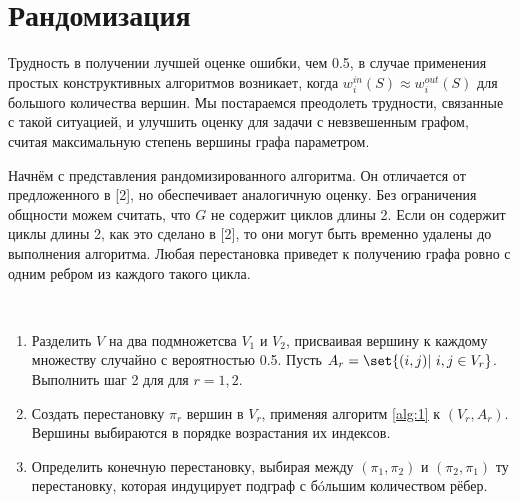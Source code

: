 \documentclass[a4paper, 12pt, oneside]{extarticle}  %
\begin{document}
\section{Рандомизация}

Трудность в получении лучшей оценке ошибки, чем 0.5, в случае применения простых конструктивных алгоритмов возникает, когда $w_{i}^{in}(S) \approx w_{i}^{out}(S)$ для большого количества вершин. Мы постараемся преодолеть трудности, связанные с такой ситуацией, и улучшить оценку для задачи с невзвешенным графом, считая максимальную степень вершины графа параметром.

Начнём с представления рандомизированного алгоритма. Он отличается от предложенного в [2], но обеспечивает аналогичную оценку. Без ограничения общности можем считать, что $G$ не содержит циклов длины 2. Если он содержит циклы длины 2, как это сделано в [2], то они могут быть временно удалены до выполнения алгоритма. Любая перестановка приведет к получению графа ровно с одним ребром из каждого такого цикла.

\begin{algo}\label{alg:2}\ \par
  \begin{enumerate}[label=\arabic*)]
    \item Разделить $V$ на два подмножетсва $V_1$ и $V_2$, присваивая вершину к каждому множеству случайно с вероятностью 0.5. Пусть $A_r = \set{(i,j)|\ i, j \in V_r}$. Выполнить шаг 2 для для $r=1,2$.
    \item Создать перестановку $\pi_r$ вершин в $V_r$, применяя алгоритм \ref{alg:1} к $(V_r, A_r)$. Вершины выбираются в порядке возрастания их индексов.
    \item Определить конечную перестановку, выбирая между $(\pi_1, \pi_2)$ и $(\pi_2, \pi_1)$ ту перестановку, которая индуцирует подграф с бóльшим количеством рёбер.
  \end{enumerate}
\end{algo}
\end{document}
